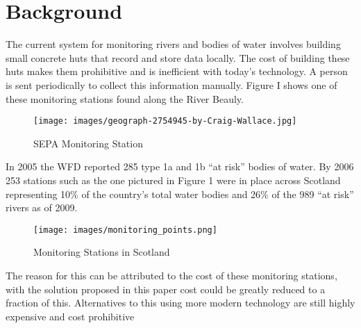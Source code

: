 \section{Background}
The current system for monitoring rivers and bodies of water involves building small concrete huts that record and store data locally. The cost of building these huts makes them prohibitive and is inefficient with today's technology. A person is sent periodically to collect this information manually. Figure I shows one of these monitoring stations found along the River Beauly. 
\begin{figure}[H]
	\centering
	\texttt{[image: images/geograph-2754945-by-Craig-Wallace.jpg]}
	\caption{ SEPA Monitoring Station \citep{Wallace2012}}
	\label{fig:monStation}
\end{figure}
In 2005 the WFD reported 285 type 1a and 1b “at risk” bodies of water. \citep{SEPA2007} By 2006  253 stations such as the one pictured in Figure 1 were in place across Scotland representing 10\% of the country’s total water bodies and 26\% of the 989  “at risk” rivers as of 2009. \citep{SEPA2009}
\begin{figure}[H]
	\centering
	\texttt{[image: images/monitoring\_points.png]}
	\caption{ Monitoring Stations in Scotland \citep{SEPA2006}}
	\label{fig:monStation}
\end{figure}
The reason for this can be attributed to the cost of these monitoring stations, with the solution proposed in this paper cost could be greatly reduced to a fraction of this. \citep{SEPA2016} Alternatives to this using more modern technology are still highly expensive and cost prohibitive \citep{TheIoTMarketplace2015}